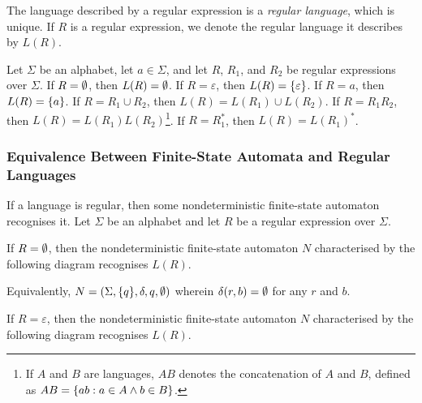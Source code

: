 The language described by a regular expression is a \emph{regular language}, which is unique. If \(R\) is a regular
expression, we denote the regular language it describes by \(L(R)\).

Let \(\Sigma\) be an alphabet, let \(a \in \Sigma\), and let \(R\), \(R_1\), and \(R_2\) be regular expressions over
\(\Sigma\). If \(R = \emptyset\), then \(L(R) = \emptyset\). If \(R = \varepsilon\), then \(L(R) = \{\varepsilon\}\). If
\(R = a\), then \(L(R) = \{a\}\). If \(R = R_1 \cup R_2\), then \(L(R) = L(R_1) \cup L(R_2)\). If \(R = R_1 R_2\),
then \(L(R) = L(R_1) L(R_2)\)\footnote{If \(A\) and \(B\) are languages, \(A B\) denotes the concatenation of \(A\) and
\(B\), defined as \(A B = \{a b : a \in A \land b \in B\}\).}. If \(R = R_1^*\), then \(L(R) = L(R_1)^*\).

\subsubsection{Equivalence Between Finite-State Automata and Regular Languages}

\Blm
  \label{lem1}
  If a language is regular, then some nondeterministic finite-state automaton recognises it.
\Elm
\Bpr
  Let \(\Sigma\) be an alphabet and let \(R\) be a regular expression over \(\Sigma\).

  If \(R = \emptyset\), then the nondeterministic finite-state automaton \(N\) characterised by the following diagram
  recognises \(L(R)\).
  \begin{figure}[!ht]
    \centering
  \end{figure}

  \noindent Equivalently, \(N = (\Sigma, \{q\}, \delta, q, \emptyset)\) wherein \(\delta(r, b) = \emptyset\) for any \(r\) and
  \(b\).

  If \(R = \varepsilon\), then the nondeterministic finite-state automaton \(N\) characterised by the following diagram
  recognises \(L(R)\).
  \begin{figure}[!ht]
    \centering
  \end{figure}

